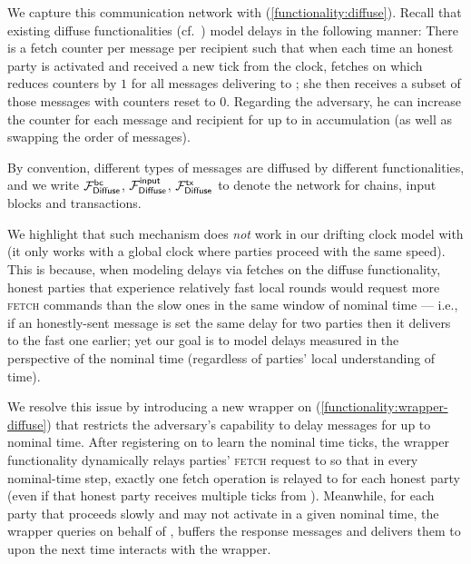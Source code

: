 We capture this communication network with \funcDiffuse (\cref{functionality:diffuse}).
%
Recall that existing diffuse functionalities (cf.~\cite{C:BMTZ17}) model delays in the following manner:
%
There is a fetch counter per message per recipient such that when each time an honest party \party is activated and received a new tick from the clock, \party fetches on \funcDiffuse which reduces counters by $1$ for all messages delivering to \party; she then receives a subset of those messages with counters reset to $0$.
%
Regarding the adversary, he can increase the counter for each message and recipient for up to \delay in accumulation (as well as swapping the order of messages).

By convention, different types of messages are diffused by different functionalities, and we write $\mathcal{F}_{\textsf{Diffuse}}^{\textsf{bc}}$, $\mathcal{F}_{\textsf{Diffuse}}^{\textsf{input}}$, $\mathcal{F}_{\textsf{Diffuse}}^{\textsf{tx}}$ to denote the network for chains, input blocks and transactions.



We highlight that such mechanism does \emph{not} work in our drifting clock model with \funcDriftingClock (it only works with a global clock where parties proceed with the same speed).
%
This is because, when modeling delays via fetches on the diffuse functionality, honest parties that experience relatively fast local rounds would request more \textsc{fetch} commands than the slow ones in the same window of nominal time --- i.e., if an honestly-sent message is set the same delay for two parties then it delivers to the fast one earlier; yet our goal is to model delays measured in the perspective of the nominal time (regardless of parties' local understanding of time).

We resolve this issue by introducing a new wrapper on \funcDiffuse (\cref{functionality:wrapper-diffuse}) that restricts the adversary's capability to delay messages for up to \delay nominal time.
%
After registering on \funcDriftingClock to learn the nominal time ticks, the wrapper functionality dynamically relays parties' \textsc{fetch} request to \funcDiffuse so that in every nominal-time step, exactly one fetch operation is relayed to \funcDiffuse for each honest party (even if that honest party receives multiple ticks from \funcDriftingClock).
%
Meanwhile, for each party \party that proceeds slowly and may not activate in a given nominal time, the wrapper queries \funcDiffuse on behalf of \party, buffers the response messages and delivers them to \party upon the next time \party interacts with the wrapper.

